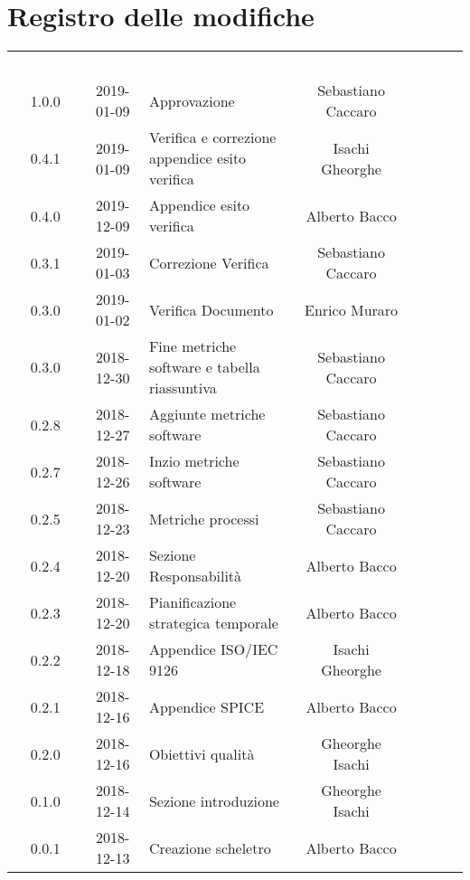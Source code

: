 
\section*{Registro delle modifiche}
{
	\renewcommand{\arraystretch}{1.5}
	\centering
	\begin{longtable}{c c C{4cm} c  c }
		\textcolor{white}{\textbf{Versione}} &
		\textcolor{white}{\textbf{Data}} &
		\textcolor{white}{\textbf{Descrizione}} &
		\textcolor{white}{\textbf{Nominativo}} &
		\textcolor{white}{\textbf{Ruolo}}
		\\
		1.0.0 &
		2019-01-09 &
		Approvazione &
		Sebastiano Caccaro &
		\Res{}
		\\
		0.4.1 &
		2019-01-09 &
		Verifica e correzione appendice esito verifica &
		Isachi Gheorghe &
		\ver{}
		\\
		0.4.0 &
		2019-12-09 &
		Appendice esito verifica &
		Alberto Bacco &
		\ver{}
		\\
		0.3.1 &
		2019-01-03 &
		Correzione Verifica &
		Sebastiano Caccaro &
		\ana{}
		\\
		0.3.0 &
		2019-01-02 &
		Verifica Documento &
		Enrico Muraro &
		\ver{}
		\\
		0.3.0 &
		2018-12-30 &
		Fine metriche software e tabella riassuntiva &
		Sebastiano Caccaro &
		\ana{}
		\\
		0.2.8 &
		2018-12-27 &
		Aggiunte metriche software  &
		Sebastiano Caccaro &
		\ana{}
		\\
		0.2.7 &
		2018-12-26 &
		Inzio metriche software &
		Sebastiano Caccaro &
		\ana{}
		\\
		0.2.5 &
		2018-12-23 &
		Metriche processi &
		Sebastiano Caccaro &
		\ana{}
		\\
		0.2.4 &
		2018-12-20 &
		Sezione Responsabilità &
		Alberto Bacco &
		\ana{}
		\\
		0.2.3 &
		2018-12-20 &
		Pianificazione strategica temporale &
		Alberto Bacco &
		\ana{}
		\\
		0.2.2 &
		2018-12-18 &
		Appendice ISO/IEC 9126 &
		Isachi Gheorghe &
		\ana{}
		\\
		0.2.1 &
		2018-12-16 &
		Appendice SPICE &
		Alberto Bacco &
		\ana{}
		\\
		0.2.0 &
		2018-12-16 &
		Obiettivi qualità &
		Gheorghe Isachi &
		\ana{}
		\\
		0.1.0 &
		2018-12-14 &
		Sezione introduzione &
		Gheorghe Isachi&
		\ana{}
		\\
		0.0.1 &
		2018-12-13 &
		Creazione scheletro &
		Alberto Bacco&
		\ana{}
		\\
	\end{longtable}

}